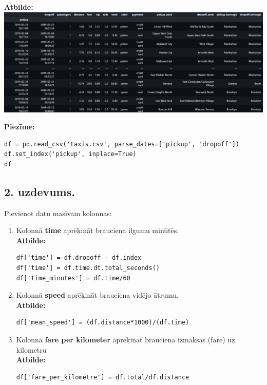 \documentclass[12pt]{article}
\begin{document}
\noindent \textbf{Atbilde:} \newline \includegraphics[width=1\textwidth]{1.uzd_2.png}

\noindent \textbf{Piezīme:}
\begin{verbatim}
df = pd.read_csv('taxis.csv', parse_dates=['pickup', 'dropoff'])
df.set_index('pickup', inplace=True)
df
\end{verbatim}

\subsection*{2. uzdevums.} Pievienot datu masīvam kolonnas:
    \begin{enumerate}
        \item Kolonnā \textbf{time} aprēķināt brauciena ilgumu minūtēs.\\
        \textbf{Atbilde:}
        \begin{verbatim}
df['time'] = df.dropoff - df.index
df['time'] = df.time.dt.total_seconds()
df['time_minutes'] = df.time/60
        \end{verbatim}

        \item Kolonnā \textbf{speed} aprēķināt brauciena vidējo ātrumu.\\
        \textbf{Atbilde:}
        \begin{verbatim}
df['mean_speed'] = (df.distance*1000)/(df.time)
        \end{verbatim}
        \item Kolonnā \textbf{fare per kilometer} aprēķināt brauciena izmaksas (fare) uz kilometru\\
        \textbf{Atbilde:}
        \begin{verbatim}
df['fare_per_kilometre'] = df.total/df.distance
        \end{verbatim}
    \end{enumerate}
\end{document}
